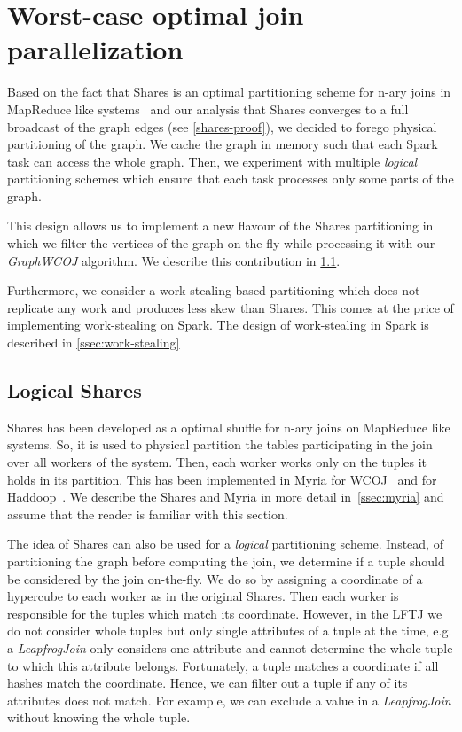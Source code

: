 \section{Worst-case optimal join parallelization}  %

Based on the fact that Shares is an optimal partitioning scheme for n-ary joins in MapReduce like systems~\cite{shares} and
our analysis that Shares converges to a full broadcast of the graph edges (see \cref{shares-proof}), we decided
to forego physical partitioning of the graph.
We cache the graph in memory such that each Spark task can access the whole graph.
Then, we experiment with multiple \textit{logical} partitioning schemes which ensure that each task processes
only some parts of the graph.

This design allows us to implement a new flavour of the Shares partitioning in which we filter the vertices of the
graph on-the-fly while processing it with our \textit{Graph\textsc{WCOJ}} algorithm.
We describe this contribution in \cref{ssec:shares-logical}.

Furthermore, we consider a work-stealing based partitioning which does not replicate any work and produces less
skew than Shares. %
This comes at the price of implementing work-stealing on Spark.
The design of work-stealing in Spark is described in \cref{ssec:work-stealing}

\subsection{Logical Shares} \label{ssec:shares-logical}
Shares has been developed as a optimal shuffle for n-ary joins on MapReduce like systems.
So, it is used to physical partition the tables participating in the join over all workers of the system.
Then, each worker works only on the tuples it holds in its partition.
This has been implemented in Myria for \textsc{WCOJ}~\cite{myria-detailed} and for Haddoop~\cite{TODO}.
We describe the Shares and Myria in more detail in~\cref{ssec:myria} and assume that the reader is familiar
with this section.

The idea of Shares can also be used for a \textit{logical} partitioning scheme.
Instead, of partitioning the graph before computing the join, we determine if a tuple should be considered by the
join on-the-fly.
We do so by assigning a coordinate of a hypercube to each worker as in the original Shares.
Then each worker is responsible for the tuples which match its coordinate.
However, in the \textsc{LFTJ} we do not consider whole tuples but only single attributes of a tuple at the time,
e.g. a \textit{LeapfrogJoin} only considers one attribute and cannot determine the whole tuple to which this attribute
belongs.
Fortunately, a tuple matches a coordinate if all hashes match the coordinate.
Hence, we can filter out a tuple if any of its attributes does not match.
For example, we can exclude a value in a \textit{LeapfrogJoin} without knowing the whole tuple.

